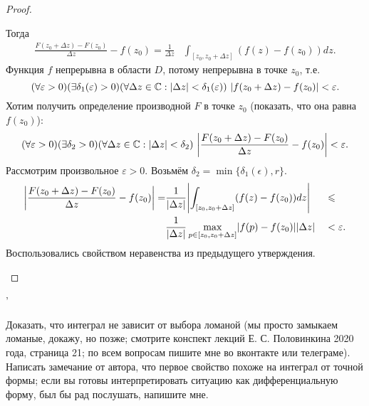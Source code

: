 \begin{proof}
\begin{enumerate}
		Тогда
		\[
			\begin{aligned}
				\frac{F(z_0 + \Delta z) - F(z_0)}{\Delta z} - f(z_0) = \frac{1}{\Delta z} & \int_{[z_0, z_0 + \Delta z]} (f(z) - f(z_0)) dz.
			\end{aligned}
		\]
		Функция $f$ непрерывна в области $D$, потому непрерывна в точке $z_0$, т.е.
		\[
			(\forall \varepsilon > 0) (\exists \delta_1(\varepsilon) > 0) \mathopen{}\left( \forall \Delta z \in \mathbb{C}: \mathopen{}\left\lvert\Delta z\right\rvert\mathclose{} < \delta_1(\varepsilon) \right)\mathclose{} \,\, \mathopen{}\left\lvert f(z_0 + \Delta z) - f(z_0)\right\rvert\mathclose{} < \varepsilon.
		\]
		Хотим получить определение производной $F$ в точке $z_0$ (показать, что она равна $f(z_0)$):
		\[
			(\forall \varepsilon > 0) (\exists \delta_2 > 0) \mathopen{}\left( \forall \Delta z \in \mathbb{C}: \mathopen{}\left\lvert\Delta z\right\rvert\mathclose{} < \delta_2 \right)\mathclose{} \,\, \mathopen{}\left\lvert\frac{F(z_0 + \Delta z) - F(z_0)}{\Delta z} - f(z_0)\right\rvert\mathclose{} < \varepsilon.
		\]
		Рассмотрим произвольное $\varepsilon > 0$. Возьмём $\delta_2 = \min \{ \delta_1(\epsilon), r \}$.
		\[
			\begin{aligned}
				\mathopen{}\left\lvert\frac{F(z_0 + \Delta z) - F(z_0)}{\Delta z} - f(z_0)\right\rvert\mathclose{} = & \frac{1}{\mathopen{}\left\lvert\Delta z\right\rvert\mathclose{}} \mathopen{}\left\lvert\int_{[z_0, z_0 + \Delta z]} (f(z) - f(z_0)) dz\right\rvert\mathclose{} && \leqslant \\
				& \frac{1}{\mathopen{}\left\lvert\Delta z\right\rvert\mathclose{}} \max_{p \in [z_0, z_0 + \Delta z]} \mathopen{}\left\lvert f(p) - f(z_0)\right\rvert\mathclose{} \mathopen{}\left\lvert\Delta z\right\rvert\mathclose{} && < \varepsilon.
			\end{aligned}
		\]
		Воспользовались свойством неравенства из предыдущего утверждения.
	\end{enumerate}
\end{proof}'

{\color{red} Доказать, что интеграл не зависит от выбора ломаной (мы просто замыкаем ломаные, докажу, но позже; смотрите конспект лекций Е. С. Половинкина 2020 года, страница 21; по всем вопросам пишите мне во вконтакте или телеграме). Написать замечание от автора, что первое свойство похоже на интеграл от точной формы; если вы готовы интерпретировать ситуацию как дифференциальную форму, был бы рад послушать, напишите мне.}

